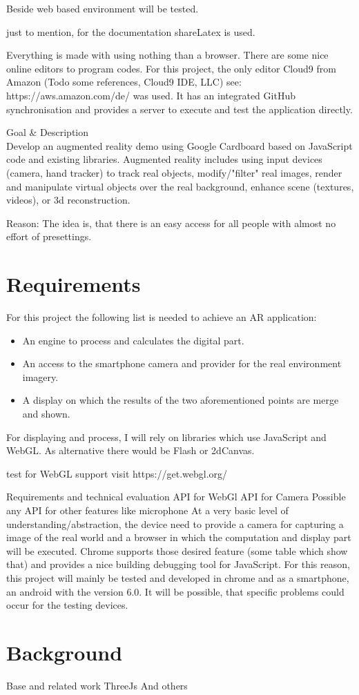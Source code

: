 Beside web based environment will be tested.

just to mention, for the documentation shareLatex is used.

Everything is made with using nothing than a browser. There are some nice online editors to program codes. For this project, the only editor Cloud9 from Amazon (Todo some references, Cloud9 IDE, LLC) 
see: https://aws.amazon.com/de/
was used. It has an integrated GitHub synchronisation and provides a server to execute and test the application directly.



Goal \& Description\\
Develop an augmented reality demo using Google Cardboard based on JavaScript code and existing libraries. Augmented reality includes using input devices (camera, hand tracker) to track real objects, modify/"filter" real images, render and manipulate virtual objects over the real background, enhance scene (textures, videos), or 3d reconstruction.

Reason: The idea is, that there is an easy access for all people with almost no effort of presettings.






\section{Requirements}

For this project the following list is needed to achieve an AR application:
\begin{itemize}
    \item An engine to process and calculates the digital part.
    \item An access to the smartphone camera and provider for the real environment imagery.
    \item A display on which the results of the two aforementioned points are merge and shown.
\end{itemize}

For displaying and process, I will rely on libraries which use JavaScript and WebGL. As alternative there would be Flash or 2dCanvas.

test for WebGL support visit https://get.webgl.org/



Requirements and technical evaluation
API for WebGl
API for Camera
Possible any API for other features like microphone
At a very basic level of understanding/abstraction, the device need to provide a camera for capturing a image of the real world and a browser in which the computation and display part will be executed. 
Chrome supports those desired feature (some table which show that) and provides a nice building debugging tool for JavaScript. For this reason, this project will mainly be tested and developed in chrome and as a smartphone, an android with the version 6.0. It will be possible, that specific problems could occur for the testing devices.


\section{Background}


Base and related work
ThreeJs
And others






